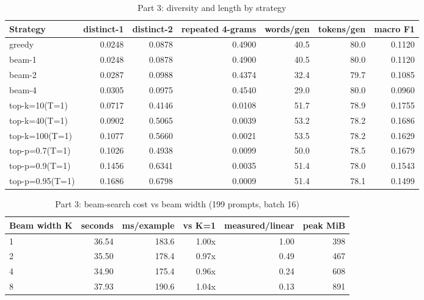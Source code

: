 \begin{table}[htbp]
  \centering
  \caption{Part 3: diversity and length by strategy}
  \label{tab:part3_diversity}
  \begin{tabular}{lrrrrrr}
    \toprule
    Strategy & distinct-1 & distinct-2 & repeated 4-grams & words/gen & tokens/gen & macro F1 \\
    \midrule
    greedy & 0.0248 & 0.0878 & 0.4900 & 40.5 & 80.0 & 0.1120 \\
    beam-1 & 0.0248 & 0.0878 & 0.4900 & 40.5 & 80.0 & 0.1120 \\
    beam-2 & 0.0287 & 0.0988 & 0.4374 & 32.4 & 79.7 & 0.1085 \\
    beam-4 & 0.0305 & 0.0975 & 0.4540 & 29.0 & 80.0 & 0.0960 \\
    top-k=10(T=1) & 0.0717 & 0.4146 & 0.0108 & 51.7 & 78.9 & 0.1755 \\
    top-k=40(T=1) & 0.0902 & 0.5065 & 0.0039 & 53.2 & 78.2 & 0.1686 \\
    top-k=100(T=1) & 0.1077 & 0.5660 & 0.0021 & 53.5 & 78.2 & 0.1629 \\
    top-p=0.7(T=1) & 0.1026 & 0.4938 & 0.0099 & 50.0 & 78.5 & 0.1679 \\
    top-p=0.9(T=1) & 0.1456 & 0.6341 & 0.0035 & 51.4 & 78.0 & 0.1543 \\
    top-p=0.95(T=1) & 0.1686 & 0.6798 & 0.0009 & 51.4 & 78.1 & 0.1499 \\
    \bottomrule
  \end{tabular}
\end{table}

\begin{table}[htbp]
  \centering
  \caption{Part 3: beam-search cost vs beam width (199 prompts, batch 16)}
  \label{tab:part3_timing}
  \begin{tabular}{lrrrrr}
    \toprule
    Beam width K & seconds & ms/example & vs K=1 & measured/linear & peak MiB \\
    \midrule
    1 & 36.54 & 183.6 & 1.00x & 1.00 & 398 \\
    2 & 35.50 & 178.4 & 0.97x & 0.49 & 467 \\
    4 & 34.90 & 175.4 & 0.96x & 0.24 & 608 \\
    8 & 37.93 & 190.6 & 1.04x & 0.13 & 891 \\
    \bottomrule
  \end{tabular}
\end{table}
